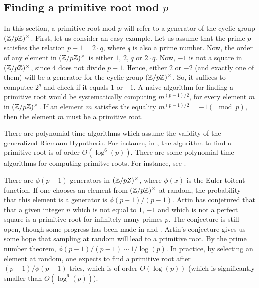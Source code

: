 \documentclass{book}
\begin{document}


\subsection{Finding a primitive root mod $p$}\label{sec:primroot}

In this section, a primitive root mod $p$ will refer to a  generator of the cyclic group $(\mathbb{Z}/p\mathbb{Z})^\times$. First, let us consider an easy example.
Let us assume that the prime $p$ satisfies the relation $p-1=2\cdot q$, where $q$ is also a prime number.
Now, the order of any element in $(\mathbb{Z}/p\mathbb{Z})^\times$ is either $1$, $2$, $q$ or $2 \cdot q$.
Now, $-1$ is not a square in $(\mathbb{Z}/p\mathbb{Z})^\times$, since $4$ does not divide $p-1$.
Hence, either $2$ or $-2$ (and exactly one of them) will be a generator for the cyclic group $(\mathbb{Z}/p\mathbb{Z})^\times$.
So, it suffices to computee $2^q$ and check if it equals $1$ or $-1$. A naive algorithm for finding a primitive root would be systematically computing $m^{(p-1)/2}$, for every element $m$ in $(\mathbb{Z}/p\mathbb{Z})^\times$. If an element $m$ satisfies the equality $m^{(p-1)/2} = -1 (\mod p)$, then the element $m$ must be a primitive root.

There are polynomial time algorithms which assume the validity of the generalized Riemann Hypothesis.
For instance, in \cite{shoup1992searching}, the algorithm to find a primitive root is of order $O(\log^6(p))$. There are some polynomial time algorithms for computing primitve roots. For instance, see \cite{dubrois2006efficient}.

There are $\phi(p-1)$ generators in $(\mathbb{Z}/pZ)^\times$, where $\phi(x)$ is the Euler-toitent function.
If one chooses an element from $(\mathbb{Z}/p\mathbb{Z})^\times$ at random, the probability that this element is a generator is $\phi(p-1)/(p-1)$.
Artin has conjetured that that a given integer $n$ which is not equal to $1$, $-1$ and which is not a perfect square is a primitive root for infinitely many primes $p$.
The conjecture is still open, though some progress has been made in \cite{gupta1984remark} and \cite{heath1986artin}.
Artin's conjecture gives us some hope that sampling at random will lead to a primitive root.
By the prime number theorem, $\phi(p-1)/(p-1) \sim 1/\log(p)$.
In practice, by selecting an element at random, one expects to find a primitive root after $(p-1)/\phi(p-1)$ tries, which is of order $O(\log(p))$ (which is significantly smaller than $O(\log^6(p))$).




\end{document}
